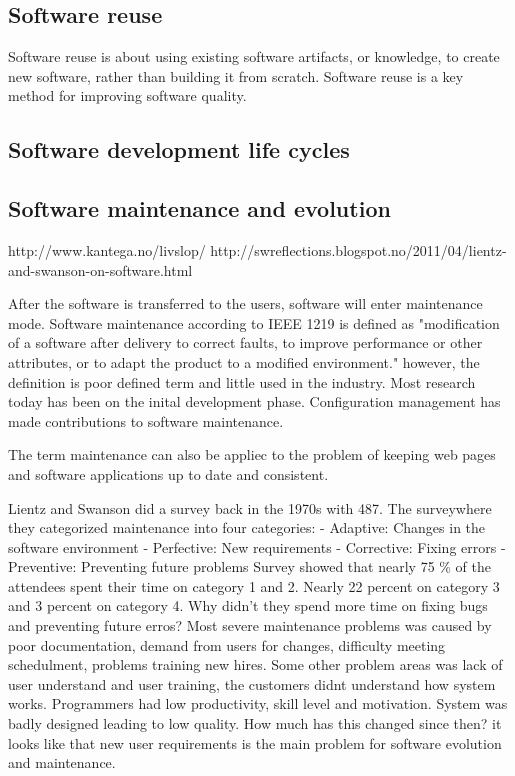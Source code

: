 \subsection{Software reuse}
Software reuse is about using existing software artifacts, or knowledge, to create new software, rather than building it from scratch. Software reuse is a key method for improving software quality. 


\subsection{Software development life cycles} %






\subsection{Software maintenance and evolution}
http://www.kantega.no/livslop/
http://swreflections.blogspot.no/2011/04/lientz-and-swanson-on-software.html

After the software is transferred to the users, software will enter maintenance mode. Software maintenance according to IEEE 1219 is defined as "modification of a software after delivery to correct faults, to improve performance or other attributes, or to adapt the product to a modified environment." however, the definition is poor defined term and little used in the industry. Most research today has been on the inital development phase. Configuration management has made contributions to software maintenance. 

The term maintenance can also be appliec to the problem of keeping web pages and software applications up to date and consistent.

Lientz and Swanson did a survey back in the 1970s with 487. The surveywhere they categorized maintenance into four categories:
- Adaptive: Changes in the software environment
- Perfective: New requirements
- Corrective: Fixing errors
- Preventive: Preventing future problems
Survey showed that nearly 75 \% of the attendees spent their time on category 1 and 2. Nearly 22 percent on category 3 and 3 percent on category 4. Why didn't they spend more time on fixing bugs and preventing future erros? Most severe maintenance problems was caused by poor documentation, demand from users for changes, difficulty meeting schedulment, problems training new hires.  Some other problem areas was lack of user understand and user training, the customers didnt understand how system works. Programmers had low productivity, skill level and motivation. System was badly designed leading to low quality. How much has this changed since then? it looks like that new user requirements is the main problem for software evolution and maintenance.

